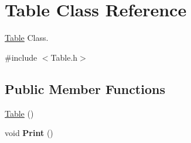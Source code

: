 \hypertarget{class_table}{\section{Table Class Reference}
\label{class_table}
}


\hyperlink{class_table}{Table} Class.  




{\ttfamily \#include $<$Table.\-h$>$}

\subsection*{Public Member Functions}
\begin{DoxyCompactItemize}
\item 
\hyperlink{class_table_a049f2e06391781ae255c6698869c4ad1}{Table} ()
\item 
\hypertarget{class_table_a2ac7d7966a5ffdf363e37300cd71e060}{void {\bfseries Print} ()}\label{class_table_a2ac7d7966a5ffdf363e37300cd71e060}


\end{DoxyCompactItemize}
